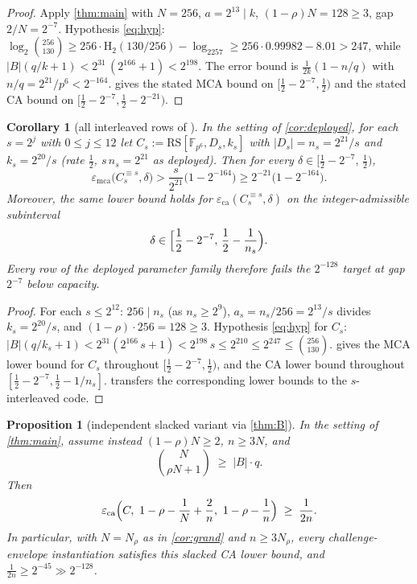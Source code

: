 \documentclass[11pt]{article}
\newtheorem{proposition}[proposition]{Proposition}
\newtheorem{corollary}[corollary]{Corollary}
\theoremstyle{definition}
\theoremstyle{remark}
\newcommand{\F}{\mathbb{F}}
\newcommand{\B}{B}
\newcommand{\RS}{\mathrm{RS}}
\newcommand{\eca}{\varepsilon_{\mathrm{ca}}}
\newcommand{\emca}{\varepsilon_{\mathrm{mca}}}
\newcommand{\Hb}{\mathrm{H}_2}
\begin{document}
\begin{proof}
Apply \cref{thm:main} with $N=256$, $a=2^{13}\mid k$, $(1-\rho)N=128\ge3$, gap $2/N=2^{-7}$. Hypothesis \eqref{eq:hyp}: $\log_2\binom{256}{130}\ge256\cdot\Hb(130/256)-\log_2257\ge256\cdot0.99982-8.01>247$, while $|\B|(q/k+1)<2^{31}\,(2^{166}+1)<2^{198}$. The error bound is $\frac1{2k}(1-n/q)$ with $n/q=2^{21}/p^6<2^{-164}$.  gives the stated MCA bound on $[\frac12-2^{-7},\frac12)$ and the stated CA bound on $[\frac12-2^{-7},\frac12-2^{-21})$.
\end{proof}

\begin{corollary}[all interleaved rows of {\cite[Tables 2--3]{ABF26}}]\label{cor:rows}
In the setting of \cref{cor:deployed}, for each $s=2^j$ with $0\le j\le12$ let $C_s:=\RS[\F_{p^6},D_s,k_s]$ with $|D_s|=n_s=2^{21}/s$ and $k_s=2^{20}/s$ (rate $\frac12$, $s\,n_s=2^{21}$ as deployed). Then for every $\delta\in\bigl[\frac12-2^{-7},\,\frac12\bigr)$,
\[
\emca\bigl(C_s^{\equiv s},\delta\bigr)
>
\frac s{2^{21}}\bigl(1-2^{-164}\bigr)
\ge
2^{-21}\bigl(1-2^{-164}\bigr).
\]
Moreover, the same lower bound holds for $\eca(C_s^{\equiv s},\delta)$ on the integer-admissible subinterval
\[
        \delta\in
        \Bigl[\frac12-2^{-7},\,\frac12-\frac1{n_s}\Bigr).
\]
Every row of the deployed parameter family therefore fails the $2^{-128}$ target at gap $2^{-7}$ below capacity.
\end{corollary}

\begin{proof}
For each $s\le2^{12}$: $256\mid n_s$ (as $n_s\ge2^9$), $a_s=n_s/256=2^{13}/s$ divides $k_s=2^{20}/s$, and $(1-\rho)\cdot256=128\ge3$. Hypothesis \eqref{eq:hyp} for $C_s$: $|\B|(q/k_s+1)<2^{31}(2^{166}\,s+1)<2^{198}\,s\le2^{210}\le2^{247}\le\binom{256}{130}$.  gives the MCA lower bound for $C_s$ throughout $[\frac12-2^{-7},\frac12)$, and the CA lower bound throughout $[\frac12-2^{-7},\frac12-1/n_s]$.  transfers the corresponding lower bounds to the $s$-interleaved code.
\end{proof}

\begin{proposition}[independent slacked variant via \cref{thm:B}]\label{prop:slacked}
In the setting of \cref{thm:main}, assume instead $(1-\rho)N\ge2$, $n\ge3N$, and
\[
\binom{N}{\rho N+1}\;\ge\;|\B|\cdot q .
\]
Then
\[
\eca\Bigl(C,\ 1-\rho-\frac1N+\frac2n,\ 1-\rho-\frac1n\Bigr)\;\ge\;\frac1{2n}.
\]
In particular, with $N=N_\rho$ as in \cref{cor:grand} and $n\ge3N_\rho$, every challenge-envelope instantiation satisfies this slacked CA lower bound, and $\frac1{2n}\ge2^{-45}\gg2^{-128}$.
\end{proposition}
\end{document}

